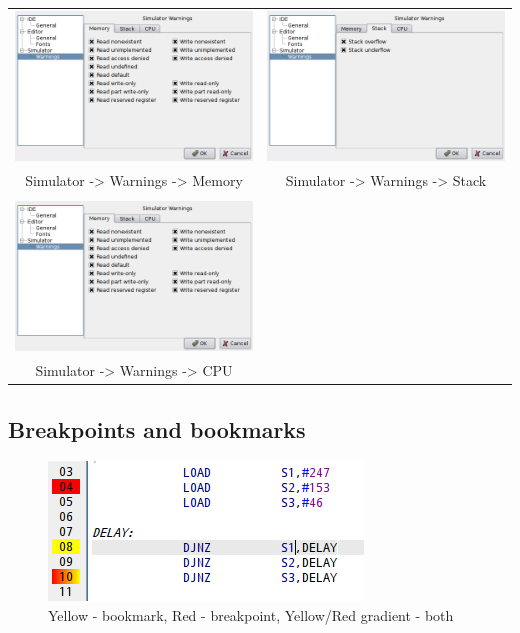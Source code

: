         \begin{table}[h!]
            \begin{tabular}{cc}
                \includegraphics[width=.45\textwidth]{img/interface4.png}
                    &
                \includegraphics[width=.45\textwidth]{img/interface5.png}
                \\ Simulator -> Warnings -> Memory & Simulator -> Warnings -> Stack
                \\
                \\ \includegraphics[width=.5\textwidth]{img/interface4.png}
                \\ Simulator -> Warnings -> CPU
            \end{tabular}
        \end{table}

    \subsection{Breakpoints and bookmarks}
         
        \begin{figure}
            \centering
                \includegraphics[width=.35\textwidth]{img/breakpoints1.png}
                \caption{Yellow - bookmark, Red - breakpoint, Yellow/Red gradient - both}
        \end{figure}

